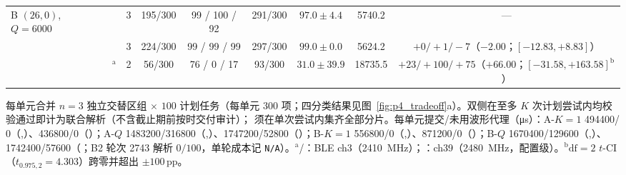\begin{table}[t]
\begin{tabular}{@{}llccccccc@{}}
\midrule
\multirow{3}{*}{B $(26,0)$, $Q{=}6000$}
  & \modejc{}              & 3 & 195/300 & 99 / 100 / 92 & 291/300 & $97.0 \pm 4.4$  & \num{5740.2}  & --- \\
  & \modesc{}              & 3 & 224/300 & 99 / 99 / 99  & 297/300 & $99.0 \pm 0.0$  & \num{5624.2}  & $+0/{+}1/{-}7$（$-2.00$；$[-12.83, +8.83]$） \\
  & \modelc{}$^{\mathrm{a}}$ & 2 & 56/300  & 76 / 0 / 17   & 93/300  & $31.0 \pm 39.9$ & \num{18735.5} & $+23/{+}100/{+}75$（$+66.00$；$[-31.58, +163.58]^{\mathrm{b}}$） \\
\bottomrule
\end{tabular}
\par\smallskip
\raggedright\scriptsize
每单元合并 $n{=}3$ 独立交替区组 $\times$ $100$ 计划任务（每单元 $300$ 项；四分类结果见图~\ref{fig:p4_tradeoff}a）。双侧在至多 $K$ 次计划尝试内均校验通过即计为联合解析（不含截止期前按时交付审计）；\modelc{} 须在单次尝试内集齐全部分片。每单元提交/未用波形代理（\si{\micro\second}）：A-$K{=}1$ \num{494400}/$0$（\modejc{},\modesc{}）、\num{436800}/$0$（\modelc{}）；A-$Q$ \num{1483200}/\num{316800}（\modejc{},\modesc{}）、\num{1747200}/\num{52800}（\modelc{}）；B-$K{=}1$ \num{556800}/$0$（\modejc{},\modesc{}）、\num{871200}/$0$（\modelc{}）；B-$Q$ \num{1670400}/\num{129600}（\modejc{},\modesc{}）、\num{1742400}/\num{57600}（\modelc{}；B2 轮次 2743 解析 $0/100$，单轮成本记 \texttt{N/A}）。$^{\mathrm{a}}$\modejc{}/\modesc{}：BLE ch3（\SI{2410}{MHz}）；\modelc{}：ch39（\SI{2480}{MHz}，配置级）。$^{\mathrm{b}}$$\text{df}{=}2$ $t$-CI（$t_{0.975,2}{=}4.303$）跨零并超出 $\pm 100$\,pp。
\end{table}
